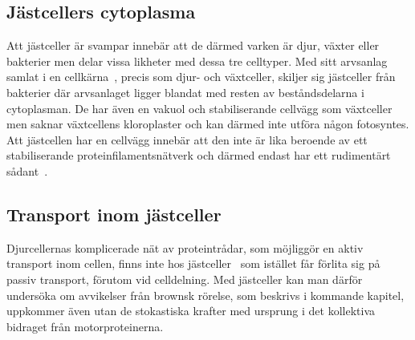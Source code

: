 \subsection{Jästcellers cytoplasma}
Att jästceller är svampar innebär att de därmed varken är djur, växter eller bakterier men delar vissa likheter med dessa tre celltyper. Med sitt arvsanlag samlat i en cellkärna~\cite{SGD_yeast}, precis som djur- och växtceller, skiljer sig jästceller från bakterier där arvsanlaget ligger blandat med resten av beståndsdelarna i cytoplasman.
De har även en vakuol och stabiliserande cellvägg som växtceller men saknar växtcellens kloroplaster och kan därmed inte utföra någon fotosyntes. Att jästcellen har en cellvägg innebär att den inte är lika beroende av ett stabiliserande proteinfilamentsnätverk och därmed endast har ett rudimentärt sådant~\cite{Midtveldt_etal2016}.

\subsection{Transport inom jästceller}
Djurcellernas komplicerade nät av proteintrådar, som möjliggör en aktiv transport inom cellen, finns inte hos jästceller~\cite{Midtveldt_etal2016} som istället får förlita sig på passiv transport, förutom vid celldelning. 
Med jästceller kan man därför undersöka om avvikelser från brownsk rörelse, som beskrivs i kommande kapitel, uppkommer även utan de stokastiska krafter med ursprung i det kollektiva bidraget från motorproteinerna.



